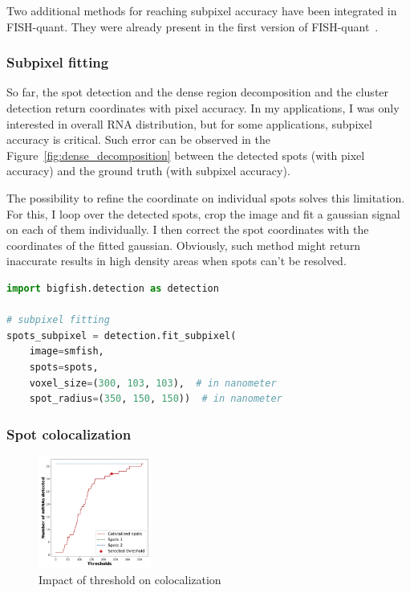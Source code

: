 Two additional methods for reaching subpixel accuracy have been integrated in FISH-quant.
They were already present in the first version of FISH-quant~\cite{mueller_fish-quant_2013}.

\subsubsection{Subpixel fitting}

So far, the spot detection and the dense region decomposition and the cluster detection return coordinates with pixel accuracy.
In my applications, I was only interested in overall \ac{RNA} distribution, but for some applications, subpixel accuracy is critical.
Such error can be observed in the Figure~\ref{fig:dense_decomposition} between the detected spots (with pixel accuracy) and the ground truth (with subpixel accuracy).

The possibility to refine the coordinate on individual spots solves this limitation.
For this, I loop over the detected spots, crop the image and fit a gaussian signal on each of them individually.
I then correct the spot coordinates with the coordinates of the fitted gaussian.
Obviously, such method might return inaccurate results in high density areas when spots can't be resolved.\\

\begin{minipage}{0.9\textwidth}
\begin{lstlisting}[language=Python]
import bigfish.detection as detection

# subpixel fitting
spots_subpixel = detection.fit_subpixel(
    image=smfish,
    spots=spots,
    voxel_size=(300, 103, 103),  # in nanometer
    spot_radius=(350, 150, 150))  # in nanometer
\end{lstlisting}
\end{minipage}

\subsubsection{Spot colocalization}

\begin{figure}
	\begin{center}
		\includegraphics[width=0.33\textwidth]{figures/chapter2/colocalization_elbow}
	\caption[Impact of threshold on colocalization]{Impact of threshold on colocalization}
	\label{fig:elbow_colocalization}
	\end{center}
\end{figure}

